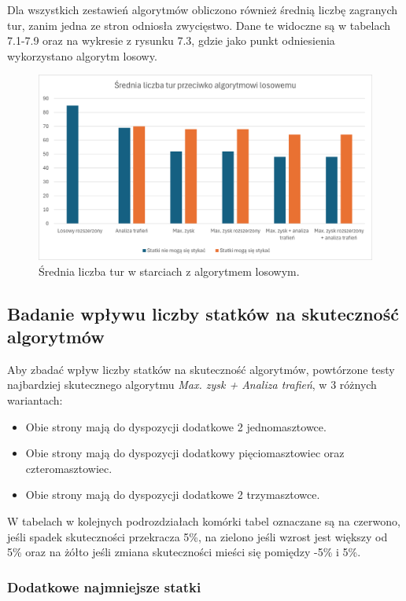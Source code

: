 Dla wszystkich zestawień algorytmów obliczono również średnią liczbę zagranych tur, zanim jedna ze stron odniosła zwycięstwo. Dane te widoczne są w tabelach 7.1-7.9 oraz na wykresie z rysunku 7.3, gdzie jako punkt odniesienia wykorzystano algorytm losowy.

\begin{figure}[!h]
    \label{fig:round-avg}
    \centering \includegraphics[width=0.9\linewidth]{img/round-count-avg.png}
    \caption{Średnia liczba tur w starciach z algorytmem losowym.}
\end{figure}

\subsection{Badanie wpływu liczby statków na skuteczność algorytmów}
Aby zbadać wpływ liczby statków na skuteczność algorytmów, powtórzone testy najbardziej skutecznego algorytmu \emph{Max. zysk + Analiza trafień}, w 3 różnych wariantach:
\begin{itemize}
    \item Obie strony mają do dyspozycji dodatkowe 2 jednomasztowce.
    \item Obie strony mają do dyspozycji dodatkowy pięciomasztowiec oraz czteromasztowiec.
    \item Obie strony mają do dyspozycji dodatkowe 2 trzymasztowce.
\end{itemize}

W tabelach w kolejnych podrozdziałach komórki tabel oznaczane są na czerwono, jeśli spadek skuteczności przekracza 5\%, na zielono jeśli wzrost jest większy od 5\% oraz na żółto jeśli zmiana skuteczności mieści się pomiędzy -5\% i 5\%.

\subsubsection{Dodatkowe najmniejsze statki}

